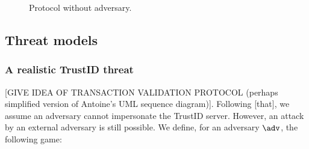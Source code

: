 \documentclass{article}
\begin{document}
\begin{figure}
    \centering
    \caption{Protocol without adversary.}
    \label{fig:no_adv}
\end{figure}

\subsection{Threat models}
\subsubsection{A realistic TrustID threat}
[GIVE IDEA OF TRANSACTION VALIDATION PROTOCOL (perhaps simplified version of Antoine's UML sequence diagram)]. Following [that], we assume an adversary cannot impersonate the TrustID server. However, an attack by an external adversary is still possible. We define, for an adversary $\adv$, the following game:
\end{document}
